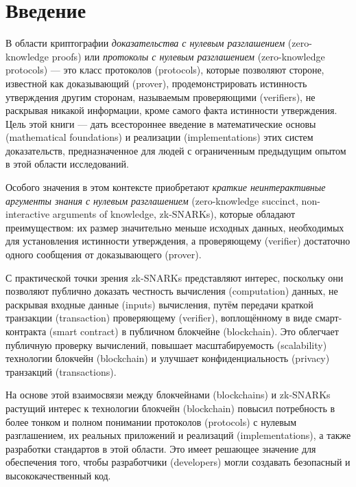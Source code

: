 \chapter{Введение}
В области криптографии \textit{доказательства с нулевым разглашением} (zero-knowledge proofs) или \textit{протоколы с нулевым разглашением} (zero-knowledge protocols) — это класс протоколов (protocols), которые позволяют стороне, известной как доказывающий (prover), продемонстрировать истинность утверждения другим сторонам, называемым проверяющими (verifiers), не раскрывая никакой информации, кроме самого факта истинности утверждения. Цель этой книги — дать всестороннее введение в математические основы (mathematical foundations) и реализации (implementations) этих систем доказательств, предназначенное для людей с ограниченным предыдущим опытом в этой области исследований.

Особого значения в этом контексте приобретают \textit{краткие неинтерактивные аргументы знания с нулевым разглашением} (zero-knowledge succinct, non-interactive arguments of knowledge, zk-SNARKs), которые обладают преимуществом: их размер значительно меньше исходных данных, необходимых для установления истинности утверждения, а проверяющему (verifier) достаточно одного сообщения от доказывающего (prover).

С практической точки зрения zk-SNARKs представляют интерес, поскольку они позволяют публично доказать честность вычисления (computation) данных, не раскрывая входные данные (inputs) вычисления, путём передачи краткой транзакции (transaction) проверяющему (verifier), воплощённому в виде смарт-контракта (smart contract) в публичном блокчейне (blockchain). Это облегчает публичную проверку вычислений, повышает масштабируемость (scalability) технологии блокчейн (blockchain) и улучшает конфиденциальность (privacy) транзакций (transactions).

На основе этой взаимосвязи между блокчейнами (blockchains) и zk-SNARKs растущий интерес к технологии блокчейн (blockchain) повысил потребность в более тонком и полном понимании протоколов (protocols) с нулевым разглашением, их реальных приложений и реализаций (implementations), а также разработки стандартов в этой области. Это имеет решающее значение для обеспечения того, чтобы разработчики (developers) могли создавать безопасный и высококачественный код.

